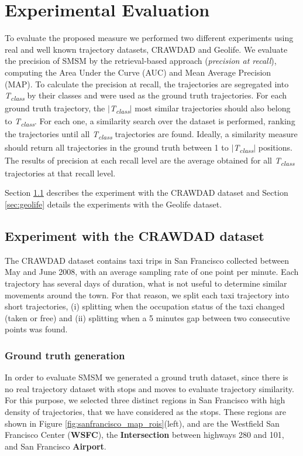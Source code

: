 \documentclass[12pt]{article}
\begin{document}
\section{Experimental Evaluation} \label{sec:experiments}
To evaluate the proposed measure we performed two different experiments using real and well known trajectory datasets, CRAWDAD\cite{epfl-mobility-20090224} and Geolife\cite{zheng2009mining}. We evaluate the precision of SMSM by the retrieval-based approach (\textit{precision at recall}), computing the Area Under the Curve (AUC) and Mean Average Precision (MAP). To calculate the precision at recall, the trajectories are segregated into \textit{T\textsubscript{class}} by their classes and were used as the ground truth trajectories. For each ground truth trajectory, the $|$\textit{T\textsubscript{class}}$|$ most similar trajectories should also belong to \textit{T\textsubscript{class}}. For each one, a similarity search over the dataset is performed, ranking the trajectories until all \textit{T\textsubscript{class}} trajectories are found. Ideally, a similarity measure should return all trajectories in the ground truth between 1 to $|$\textit{T\textsubscript{class}}$|$ positions. The results of precision at each recall level are the average obtained for all \textit{T\textsubscript{class}} trajectories at that recall level.

Section \ref{sec:crawdad} describes the experiment with the CRAWDAD dataset and Section \ref{sec:geolife} details the experiments with the Geolife dataset.

\subsection{Experiment with the CRAWDAD dataset}\label{sec:crawdad}

The CRAWDAD dataset contains taxi trips in San Francisco collected between May and June 2008, with an average sampling rate of one point per minute. Each trajectory has several days of duration, what is not useful to determine similar movements around the town. For that reason, we split each taxi trajectory into short trajectories, (i) splitting when the occupation status of the taxi changed (taken or free) and (ii) splitting when a 5 minutes gap between two consecutive points was found.

\subsubsection{Ground truth generation}
In order to evaluate SMSM we generated a ground truth dataset, since there is no real trajectory dataset with stops and moves to evaluate trajectory similarity. For this purpose, we selected three distinct regions in San Francisco with high density of trajectories, that we have considered as the stops. These regions are shown in Figure \ref{fig:sanfrancisco_map_rois}(left), and are the Westfield San Francisco Center (\textbf{WSFC}), the \textbf{Intersection} between highways 280 and 101, and San Francisco \textbf{Airport}.
\end{document}
